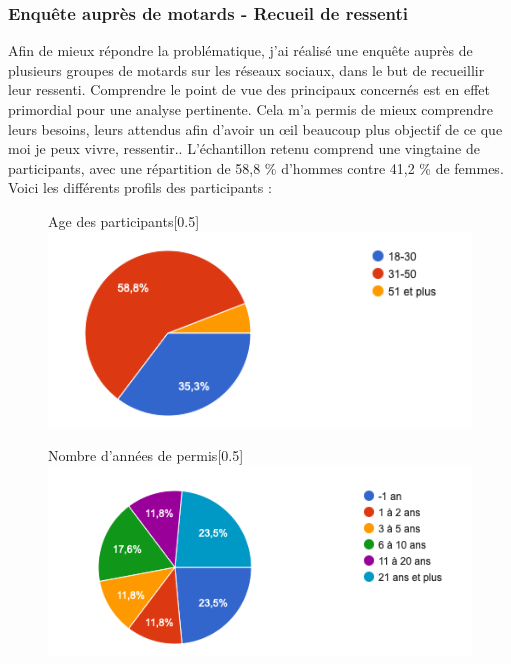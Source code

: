\subsubsection{Enquête auprès de motards - Recueil de ressenti}
Afin de mieux répondre la problématique, j’ai réalisé une enquête auprès de plusieurs groupes de motards sur les réseaux sociaux, dans le but de recueillir leur ressenti. Comprendre le point de vue des principaux concernés est en effet primordial pour une analyse pertinente. Cela m'a permis de mieux comprendre leurs besoins, leurs attendus afin d'avoir un œil beaucoup plus objectif de ce que moi je peux vivre, ressentir.. L’échantillon retenu comprend une vingtaine de participants, avec une répartition de 58,8 \% d'hommes contre 41,2 \% de femmes.
Voici les différents profils des participants :
\begin{figure}[H]
  \centering
  \begin{subcaptionbox}{Age des participants}[0.5\linewidth]
    {\includegraphics[width=\linewidth]{coeur_memoire/graphique/age.png}}
  \end{subcaptionbox}
  \hfill
  \begin{subcaptionbox}{Nombre d'années de permis}[0.5\linewidth]
    {\includegraphics[width=\linewidth]{coeur_memoire/graphique/nb_annees_permis.png}}
  \end{subcaptionbox}


\end{figure}
